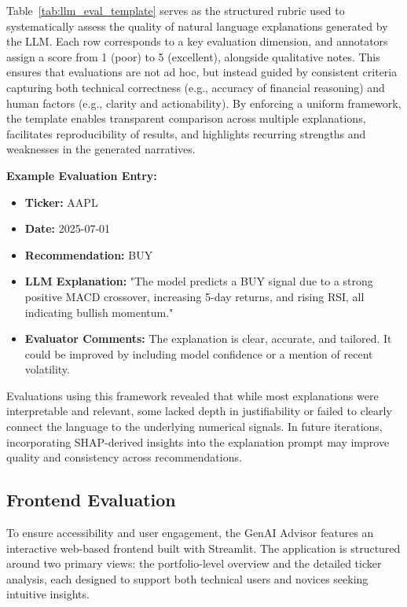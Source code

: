 Table~\ref{tab:llm_eval_template} serves as the structured rubric used to systematically assess the quality of natural language explanations generated by the LLM. Each row corresponds to a key evaluation dimension, and annotators assign a score from 1 (poor) to 5 (excellent), alongside qualitative notes. This ensures that evaluations are not ad hoc, but instead guided by consistent criteria capturing both technical correctness (e.g., accuracy of financial reasoning) and human factors (e.g., clarity and actionability). By enforcing a uniform framework, the template enables transparent comparison across multiple explanations, facilitates reproducibility of results, and highlights recurring strengths and weaknesses in the generated narratives.

\vspace{0.5cm}

\noindent
\textbf{Example Evaluation Entry:}

\begin{itemize}
  \item \textbf{Ticker:} AAPL  
  \item \textbf{Date:} 2025-07-01  
  \item \textbf{Recommendation:} BUY  
  \item \textbf{LLM Explanation:} "The model predicts a BUY signal due to a strong positive MACD crossover, increasing 5-day returns, and rising RSI, all indicating bullish momentum."
  \item \textbf{Evaluator Comments:} The explanation is clear, accurate, and tailored. It could be improved by including model confidence or a mention of recent volatility.
\end{itemize}

\medskip

Evaluations using this framework revealed that while most explanations were interpretable and relevant, some lacked depth in justifiability or failed to clearly connect the language to the underlying numerical signals. In future iterations, incorporating SHAP-derived insights into the explanation prompt may improve quality and consistency across recommendations.

\subsection{Frontend Evaluation}

To ensure accessibility and user engagement, the GenAI Advisor features an interactive web-based frontend built with Streamlit. The application is structured around two primary views: the portfolio-level overview and the detailed ticker analysis, each designed to support both technical users and novices seeking intuitive insights.

